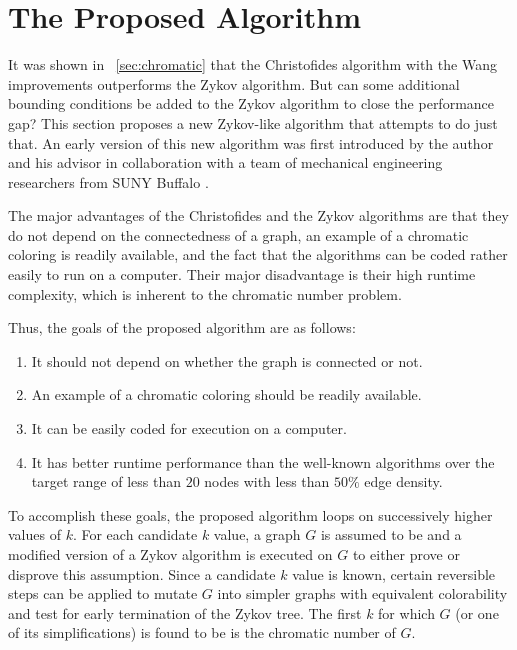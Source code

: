 \section{The Proposed Algorithm}\label{sec:algorithm}

It was shown in \sectionname~\ref{sec:chromatic} that the Christofides algorithm with the Wang improvements
outperforms the Zykov algorithm.  But can some additional bounding conditions be added to the Zykov algorithm to
close the performance gap?  This section proposes a new Zykov-like algorithm that attempts to do just that.  An
early version of this new algorithm was first introduced by the author and his advisor in collaboration with a team
of mechanical engineering researchers from SUNY Buffalo \cite{cavallaro}.

The major advantages of the Christofides and the Zykov algorithms are that they do not depend on the connectedness
of a graph, an example of a chromatic coloring is readily available, and the fact that the algorithms can be coded
rather easily to run on a computer.  Their major disadvantage is their high runtime complexity, which is inherent
to the chromatic number problem.

Thus, the goals of the proposed algorithm are as follows:
\begin{enumerate}
\item It should not depend on whether the graph is connected or not.
\item An example of a chromatic coloring should be readily available.
\item It can be easily coded for execution on a computer.
\item It has better runtime performance than the well-known algorithms over the target range of less than
  \(20\) nodes with less than \(50\%\) edge density.
\end{enumerate}

To accomplish these goals, the proposed algorithm loops on successively higher values of \(k\).  For each candidate
\(k\) value, a graph \(G\) is assumed to be  and a modified version of a Zykov algorithm is executed
on \(G\) to either prove or disprove this assumption.  Since a candidate \(k\) value is known, certain reversible
steps can be applied to mutate \(G\) into simpler graphs with equivalent colorability and test for early
termination of the Zykov tree.  The first \(k\) for which \(G\) (or one of its simplifications) is found to be
 is the chromatic number of \(G\).

